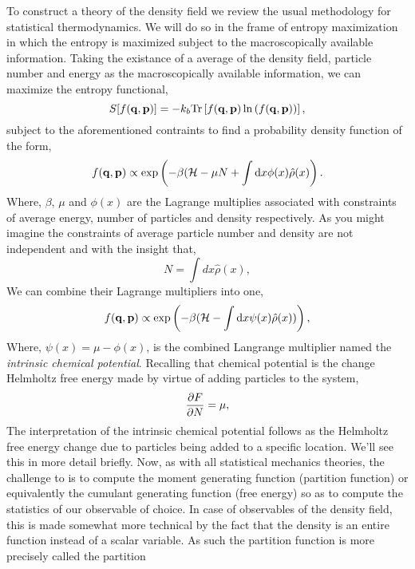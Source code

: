 To construct a theory of the density field we review the usual methodology for
statistical thermodynamics. We will do so in the frame of entropy maximization
in which the entropy is maximized subject to the macroscopically available
information. Taking the existance of a average of the density field, particle
number and energy as the macroscopically available information, we can maximize
the entropy functional, \begin{equation} S[f(\mathbf{q}, \mathbf{p})] = -k_b \mathrm{Tr}\left[ f(\mathbf{q},
\mathbf{p})\ln\left(f(\mathbf{q}, \mathbf{p})\right) \right], \end{equation}
%
subject to the aforementioned contraints to find a probability density function
of the form,
%
\begin{equation} f(\mathbf{q}, \mathbf{p}) \propto \exp\left(-\beta(\mathcal{H} -\mu N + \int \mathrm{d}x
\phi(x)\hat{\rho}(x)\right).  \end{equation}
%
Where, $\beta$, $\mu$ and $\phi(x)$ are the Lagrange multiplies associated with
constraints of average energy, number of particles and density respectively. As
you might imagine the constraints of average particle number and density are
not independent and with the insight that,
%
\begin{equation} N = \int dx \hat{\rho}(x), \end{equation}
%
We can combine their Lagrange multipliers into one,
%
\begin{equation} f(\mathbf{q}, \mathbf{p}) \propto \exp\left(- \beta(\mathcal{H} - \int \mathrm{d}x
\psi(x) \hat{\rho}(x))\right), \end{equation}
%
Where, $\psi(x) = \mu - \phi(x)$, is the combined Langrange multiplier named
the \textit{intrinsic chemical potential}. Recalling that chemical potential is
the change Helmholtz free energy made by virtue of adding particles to the
system,
%
\begin{equation} \frac{\partial F}{\partial N} = \mu, \end{equation}
%
The interpretation of the intrinsic chemical potential follows as the Helmholtz
free energy change due to particles being added to a specific location.  We'll
see this in more detail briefly.  Now, as with all statistical mechanics
theories, the challenge to is to compute the moment generating function
(partition function) or equivalently the cumulant generating function (free
energy) so as to compute the statistics of our observable of choice.  In case
of observables of the density field, this is made somewhat more technical by
the fact that the density is an entire function instead of a scalar variable.
As such the partition function is more precisely called the partition
